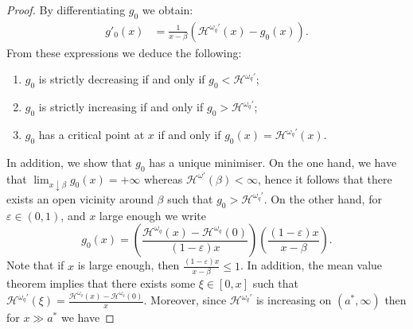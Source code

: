 \documentclass[11pt,reqno]{amsart}
\newcommand{\cH}{\mathcal{H}}
\newcommand{\homega}{\omega_q}
\newcommand{\PAR}[1]{{{\left(#1\right)}}} %
\renewcommand{\leq}{\leqslant}
\begin{document}
\begin{proof}
		By differentiating $g_0$ we obtain:
	\begin{align*}
		g'_{0}(x)&=\frac{1}{x-\beta}(\cH^{\homega\prime}(x) - g_0(x)).
	\end{align*}
	From these expressions we deduce the following:
	\begin{enumerate}
		\item $g_0$ is strictly decreasing if and only if $ g_0 < \cH^{\homega\prime}$;
		\item $g_0$ is strictly increasing if and only if $ g_0 > \cH^{\homega\prime}$;
		\item $g_0$ has a critical point at $x$ if and only if $ g_0(x) = \cH^{\homega\prime}(x)$.
	\end{enumerate}
	In addition, we show that $g_0$ has a unique minimiser. On the one hand, we have that $\lim_{x\downarrow \beta}g_0(x) = + \infty$ whereas $\cH^{\omega\prime}(\beta)< \infty$, hence it follows that there exists an open vicinity around $\beta$ such that $g_0 > \cH^{\homega\prime}$. On the other hand, for $\varepsilon \in (0,1)$, and $x$ large enough we write 
	\[
	g_0(x) = \PAR{\frac{\cH^{\homega}(x) - \cH^{\homega}(0)}{(1-\varepsilon)x}}\PAR{\frac{(1-\varepsilon)x}{x-\beta}}.
	\]
	Note that if $x$ is large enough, then $\frac{(1-\varepsilon)x}{x-\beta}\leq 1$. In addition, the mean value theorem implies that there exists some $\xi \in [0,x]$ such that $\cH^{\homega\prime}(\xi) = \frac{\cH^{\homega}(x) - \cH^{\homega}(0)}{x}$. Moreover, since $\cH^{\homega\prime}$ is increasing on $(a^\ast,\infty)$ then for $x \gg a^\ast$ we have

\end{proof}
\end{document}
